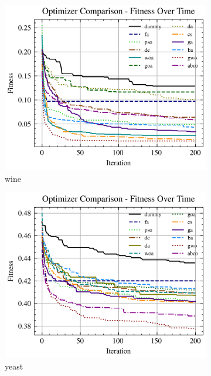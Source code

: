 \begin{figure}[htp]
    \begin{subfigure}[htp]{0.45\textwidth}
        \includegraphics[width=\textwidth]{imagenes/fitness_charts/img/real/wine/optimizers_fitness_knn.png}
        \caption{wine}
    \end{subfigure}
    \begin{subfigure}[htp]{0.45\textwidth}
        \includegraphics[width=\textwidth]{imagenes/fitness_charts/img/real/yeast/optimizers_fitness_knn.png}
        \caption{yeast}
    \end{subfigure}
    \begin{subfigure}[htp]{0.45\textwidth}

\end{subfigure}
\end{figure}
